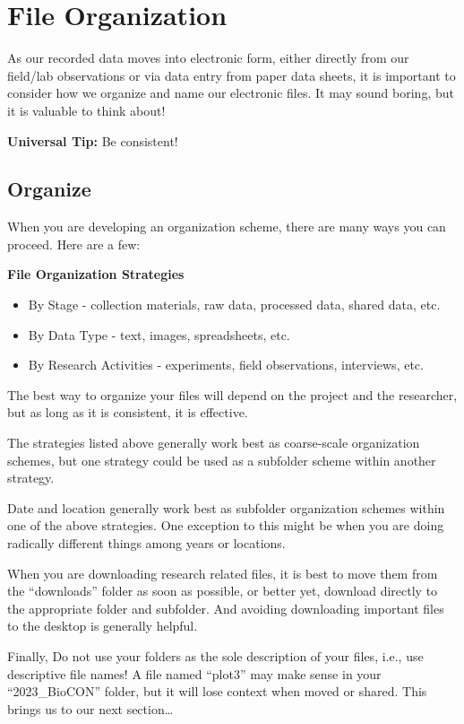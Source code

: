 \documentclass[
  letterpaper,
  DIV=11,
  numbers=noendperiod]{scrreprt}
\begin{document}
\chapter{File Organization}\label{file-organization}

As our recorded data moves into electronic form, either directly from
our field/lab observations or via data entry from paper data sheets, it
is important to consider how we organize and name our electronic files.
It may sound boring, but it is valuable to think about!

\textbf{Universal Tip:} Be consistent!

\section{Organize}\label{organize}

When you are developing an organization scheme, there are many ways you
can proceed. Here are a few:

\textbf{File Organization Strategies}

\begin{itemize}
\item
  By Stage - collection materials, raw data, processed data, shared
  data, etc.
\item
  By Data Type - text, images, spreadsheets, etc.
\item
  By Research Activities - experiments, field observations, interviews,
  etc.
\end{itemize}

The best way to organize your files will depend on the project and the
researcher, but as long as it is consistent, it is effective.

The strategies listed above generally work best as coarse-scale
organization schemes, but one strategy could be used as a subfolder
scheme within another strategy.

Date and location generally work best as subfolder organization schemes
within one of the above strategies. One exception to this might be when
you are doing radically different things among years or locations.

When you are downloading research related files, it is best to move them
from the ``downloads'' folder as soon as possible, or better yet,
download directly to the appropriate folder and subfolder. And avoiding
downloading important files to the desktop is generally helpful.

Finally, Do not use your folders as the sole description of your files,
i.e., use descriptive file names! A file named ``plot3'' may make sense
in your ``2023\_BioCON'' folder, but it will lose context when moved or
shared. This brings us to our next section\ldots{}
\end{document}
